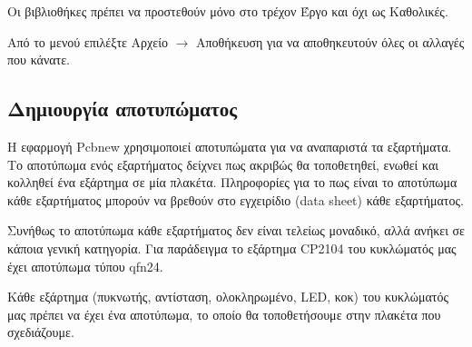 \documentclass[a4paper]{article}
\begin{document}
Οι βιβλιοθήκες πρέπει να προστεθούν μόνο στο τρέχον Έργο και όχι ως Καθολικές.

\begin{figure}
  \begin{center}
    \label{fig:kicad-main}
  \end{center}
\end{figure}

\begin{figure}
  \begin{center}
    \label{fig:kicad-main}
  \end{center}
\end{figure}


Από το μενού επιλέξτε Αρχείο $\rightarrow$ Αποθήκευση για να αποθηκευτούν όλες οι αλλαγές που κάνατε.


\subsection{Δημιουργία αποτυπώματος}
Η εφαρμογή \textenglish{Pcbnew} χρησιμοποιεί αποτυπώματα για να αναπαριστά τα εξαρτήματα. Το αποτύπωμα ενός εξαρτήματος δείχνει πως ακριβώς θα τοποθετηθεί, ενωθεί και κολληθεί ένα εξάρτημα σε μία πλακέτα. Πληροφορίες για το πως είναι το αποτύπωμα κάθε εξαρτήματος μπορούν να βρεθούν στο εγχειρίδιο (data sheet) κάθε εξαρτήματος. 

Συνήθως το αποτύπωμα κάθε εξαρτήματος δεν είναι τελείως μοναδικό, αλλά ανήκει σε κάποια γενική κατηγορία. Για παράδειγμα το εξάρτημα \textenglish{CP2104} του κυκλώματός μας έχει αποτύπωμα τύπου qfn24.

Κάθε εξάρτημα (πυκνωτής, αντίσταση, ολοκληρωμένο, \textenglish{LED}, κοκ) του κυκλώματός μας πρέπει να έχει ένα αποτύπωμα, το οποίο θα τοποθετήσουμε στην πλακέτα που σχεδιάζουμε.

\begin{figure}
  \begin{center}
    \label{fig:kicad-main}
  \end{center}
\end{figure}
\end{document}
